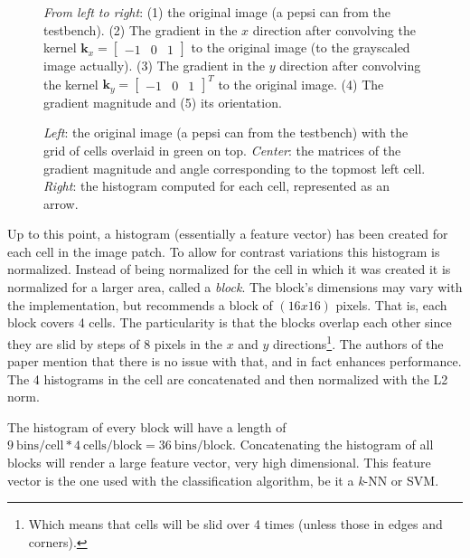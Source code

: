 \documentclass[../main.tex]{subfiles}
\begin{document}
\begin{figure}[htbp]
    \centering
    \caption{\emph{From left to right}: (1) the original image (a pepsi can from the testbench). (2) The gradient in the $x$ direction after convolving the kernel $\boldsymbol{k}_{x} = \begin{bmatrix} -1 & 0 & 1 \end{bmatrix}$ to the original image (to the grayscaled image actually). (3) The gradient in the $y$ direction after convolving the kernel $\boldsymbol{k}_{y} = \begin{bmatrix} -1 & 0 & 1 \end{bmatrix}^{T}$ to the original image. (4) The gradient magnitude and (5) its orientation.}
    \label{fig:pepsi_gradients}
\end{figure}

\begin{figure}[htbp]
    \centering
    \caption{\emph{Left}: the original image (a pepsi can from the testbench) with the grid of cells overlaid in green on top. \emph{Center}: the matrices of the gradient magnitude and angle corresponding to the topmost left cell. \emph{Right}: the histogram computed for each cell, represented as an arrow.}
    \label{fig:pepsi_cellinfo}
\end{figure}

Up to this point, a histogram (essentially a feature vector) has been created for each cell in the image patch. To allow for contrast variations this histogram is normalized. Instead of being normalized for the cell in which it was created it is normalized for a larger area, called a \emph{block}. The block's dimensions may vary with the implementation, but \cite{hog_paper} recommends a block of $\left(16x16\right)$ pixels. That is, each block covers 4 cells. The particularity is that the blocks overlap each other since they are slid by steps of $8$ pixels in the $x$ and $y$ directions\footnote{Which means that cells will be slid over 4 times (unless those in edges and corners).}. The authors of the paper mention that there is no issue with that, and in fact enhances performance. The 4 histograms in the cell are concatenated and then normalized with the L2 norm.

The histogram of every block will have a length of $9 \: \text{bins/cell} * 4 \: \text{cells/block} = 36 \: \text{bins/block} $. Concatenating the histogram of all blocks will render a large feature vector, very high dimensional. This feature vector is the one used with the classification algorithm, be it a \emph{k}-NN or SVM.
\end{document}
